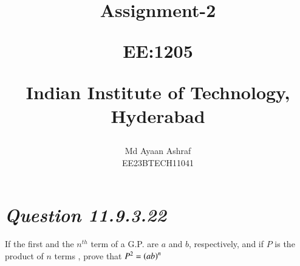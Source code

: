 \documentclass[journal,12pt,twocolumn]{IEEEtran}
\theoremstyle{remark}
\begin{document}
%




\vspace{3cm}

\title{
Assignment-2

\large{EE:1205 }

Indian Institute of Technology, Hyderabad
}
\author{Md Ayaan Ashraf

EE23BTECH11041
}  
\maketitle
\newpage
\bigskip
\renewcommand{\thefigure}{\arabic{figure}}
\renewcommand{\thetable}{\arabic{table}}
\section*{\textit{\textbf{Question 11.9.3.22}}}
 If the first and the  $n^{th}$  term of a G.P. are $a$ and $b$, respectively, and if $P$ is the product of $n$ terms , prove that $ P^2 = \left(ab\right)^n $
\end{document}

